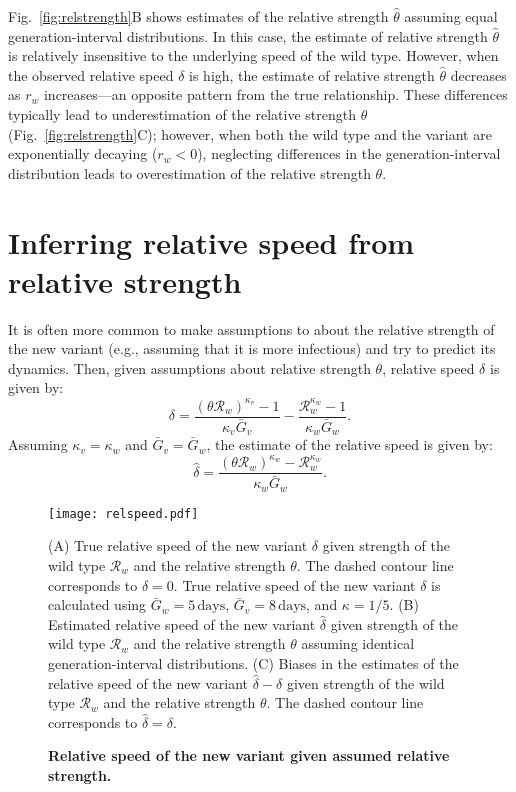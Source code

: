 \documentclass[12pt]{article}
\newcommand{\fref}[1]{Fig.~\ref{fig:#1}}
\newcommand{\RR}{\ensuremath{{\mathcal R}}\xspace}
\begin{document}
\fref{relstrength}B shows estimates of the relative strength $\hat{\theta}$ assuming equal generation-interval distributions.
In this case, the estimate of relative strength $\hat{\theta}$ is relatively insensitive to the underlying speed of the wild type.
However, when the observed relative speed $\delta$ is high, the estimate of relative strength $\hat{\theta}$ decreases as $r_w$ increases---an opposite pattern from the true relationship.
These differences typically lead to underestimation of the relative strength $\theta$ (\fref{relstrength}C);
however, when both the wild type and the variant are exponentially decaying ($r_w < 0$), neglecting differences in the generation-interval distribution leads to overestimation of the relative strength $\theta$.

\section{Inferring relative speed from relative strength}

It is often more common to make assumptions to about the relative strength of the new variant (e.g., assuming that it is more infectious) and try to predict its dynamics.
Then, given assumptions about relative strength $\theta$, relative speed $\delta$ is given by:
\begin{equation}
\delta = \frac{(\theta \RR_w)^{\kappa_v} - 1}{\kappa_v \bar{G}_v} - \frac{\RR_w^{\kappa_w} - 1}{\kappa_w \bar{G}_w}.
\end{equation}
Assuming $\kappa_v = \kappa_w$ and $\bar{G}_v = \bar{G}_w$, the estimate of the relative speed is given by:
\begin{equation}
\hat{\delta} = \frac{(\theta \RR_w)^{\kappa_w} - \RR_w^{\kappa_w}}{\kappa_w \bar{G}_w}.
\end{equation}


\begin{figure}[!th]
\texttt{[image: relspeed.pdf]}
\caption{
\textbf{Relative speed of the new variant given assumed relative strength.}
}
(A) True relative speed of the new variant $\delta$ given strength of the wild type $\RR_w$ and the relative strength $\theta$.
The dashed contour line corresponds to $\delta = 0$.
True relative speed of the new variant $\delta$ is calculated using $\bar{G}_w = 5\,\textrm{days}$, $\bar{G}_v = 8\,\textrm{days}$, and $\kappa = 1/5$. 
(B) Estimated relative speed of the new variant $\hat{\delta}$ given strength of the wild type $\RR_w$ and the relative strength $\theta$ assuming identical generation-interval distributions.
(C) Biases in the estimates of the relative speed of the new variant $\hat{\delta} - \delta$ given strength of the wild type $\RR_w$ and the relative strength $\theta$.
The dashed contour line corresponds to $\hat{\delta} = \delta$.
\label{fig:relspeed}
\end{figure}
\end{document}

